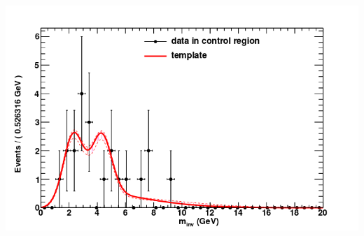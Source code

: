 \documentclass[compress]{beamer}
\begin{document}
\begin{frame}
\begin{columns}
\includegraphics[width=\linewidth]{template_control__bkg_model_a2_inv__m_inv.png}
\end{columns}
\end{frame}
\end{document}
